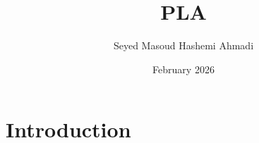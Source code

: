 \documentclass{article}
\title{PLA}
\author{Seyed Masoud Hashemi Ahmadi}
\date{February 2026}
\begin{document}
\maketitle

\section{Introduction}
\end{document}
